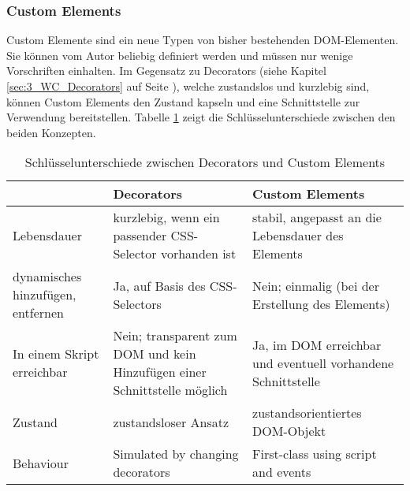 \subsubsection{Custom Elements}
\label{sec:3_WC_Elements}

Custom Elemente sind ein neue Typen von bisher bestehenden DOM-Elementen. Sie können vom Autor beliebig definiert werden und müssen nur wenige Vorschriften einhalten. Im Gegensatz zu Decorators (siehe Kapitel \ref{sec:3_WC_Decorators} auf Seite \pageref{sec:3_WC_Decorators}), welche zustandslos und kurzlebig sind, können Custom Elements den Zustand kapseln und eine Schnittstelle zur Verwendung bereitstellen. Tabelle \ref{tab:Unterschiede} zeigt die Schlüsselunterschiede zwischen den beiden Konzepten.

\begin{table}[h]
\centering
\begin{tabular}{ l || l | l}
& Decorators & Custom Elements \\
\hline
\hline
Lebensdauer & kurzlebig, wenn ein passender CSS-Selector vorhanden ist & stabil, angepasst an die Lebensdauer des Elements\\
\hline
dynamisches hinzufügen, entfernen & Ja, auf Basis des CSS-Selectors & Nein; einmalig (bei der Erstellung des Elements)\\
\hline
In einem Skript erreichbar& Nein; transparent zum DOM und kein Hinzufügen einer Schnittstelle möglich & Ja, im DOM erreichbar und eventuell vorhandene Schnittstelle\\
\hline
Zustand & zustandsloser Ansatz & zustandsorientiertes DOM-Objekt \\
\hline
Behaviour & Simulated by changing decorators & First-class using script and events \\
\end{tabular}
\caption[
Schlüsselunterschiede zwischen Decorators und Custom Elements
]
{Schlüsselunterschiede zwischen Decorators und Custom Elements}
\label{tab:Unterschiede}
\end{table}